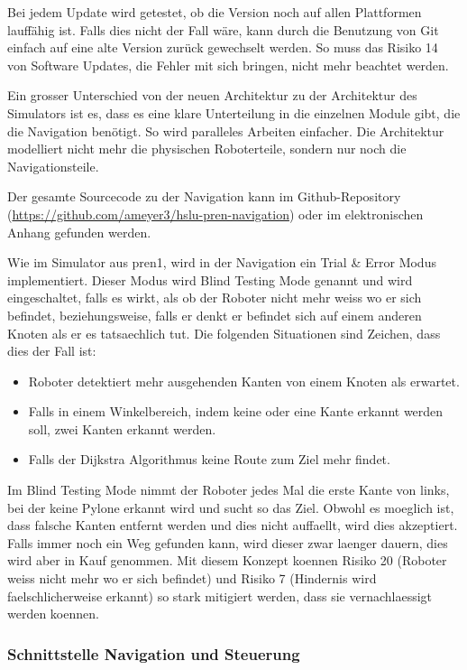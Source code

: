 Bei jedem Update wird getestet, ob die Version noch auf allen Plattformen lauffähig ist. Falls dies nicht der Fall wäre, kann durch die Benutzung von Git einfach auf eine alte Version zurück gewechselt werden. So muss das Risiko 14 von Software Updates, die Fehler mit sich bringen, nicht mehr beachtet werden.

Ein grosser Unterschied von der neuen Architektur zu der Architektur des Simulators ist es, dass es eine klare Unterteilung in die einzelnen Module gibt, die die Navigation benötigt. So wird paralleles Arbeiten einfacher. Die Architektur modelliert nicht mehr die physischen Roboterteile, sondern nur noch die Navigationsteile.

Der gesamte Sourcecode zu der Navigation kann im Github-Repository (\url{https://github.com/ameyer3/hslu-pren-navigation}) oder im elektronischen Anhang gefunden werden.

Wie im Simulator aus \acrshort{pren1}, wird in der Navigation ein Trial \& Error Modus implementiert. Dieser Modus wird Blind Testing Mode genannt und wird eingeschaltet, falls es wirkt, als ob der Roboter nicht mehr weiss wo er sich befindet, beziehungsweise, falls er denkt er befindet sich auf einem anderen Knoten als er es tatsaechlich tut. Die folgenden Situationen sind Zeichen, dass dies der Fall ist:

\begin{itemize}
    \item Roboter detektiert mehr ausgehenden Kanten von einem Knoten als erwartet.
    \item Falls in einem Winkelbereich, indem keine oder eine Kante erkannt werden soll, zwei Kanten erkannt werden.
    \item Falls der Dijkstra Algorithmus keine Route zum Ziel mehr findet.
\end{itemize}

Im Blind Testing Mode nimmt der Roboter jedes Mal die erste Kante von links, bei der keine Pylone erkannt wird und sucht so das Ziel. Obwohl es moeglich ist, dass falsche Kanten entfernt werden und dies nicht auffaellt, wird dies akzeptiert. Falls immer noch ein Weg gefunden kann, wird dieser zwar laenger dauern, dies wird aber in Kauf genommen. Mit diesem Konzept koennen Risiko 20 (Roboter weiss nicht mehr wo er sich befindet) und Risiko 7 (Hindernis wird faelschlicherweise erkannt) so stark mitigiert werden, dass sie vernachlaessigt werden koennen.

\subsubsection{Schnittstelle Navigation und Steuerung}
\label{interface-nav-control}

